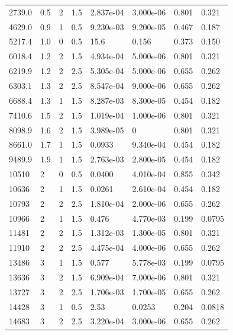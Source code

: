 \documentclass[preview]{standalone}
\begin{document}
{{\begin{tabular}{L{1.2cm}C{1.2cm} C{0.3cm}C{0.5cm} C{1.4cm}C{1.4cm} C{1.4cm}C{1.4cm}}
  2739.0  &   0.5  & 2     & 1.5 &  2.837e-04  & 3.000e-06  & 0.801 &  0.321   \\ 
  4629.0  &   0.9  & 1     & 0.5 &  9.230e-03  & 9.200e-05  & 0.467 &  0.187   \\ 
  5217.4  &   1.0  & 0     & 0.5 &  15.6  & 0.156  & 0.373 &  0.150   \\ 
  6018.4  &   1.2  & 2     & 1.5 &  4.934e-04  & 5.000e-06  & 0.801 &  0.321   \\ 
  6219.9  &   1.2  & 2     & 2.5 &  5.305e-04  & 5.000e-06  & 0.655 &  0.262   \\ 
  6303.1  &   1.3  & 2     & 2.5 &  8.547e-04  & 9.000e-06  & 0.655 &  0.262   \\ 
  6688.4  &   1.3  & 1     & 1.5 &  8.287e-03  & 8.300e-05  & 0.454 &  0.182   \\ 
  7410.6  &   1.5  & 2     & 1.5 &  1.019e-04  & 1.000e-06  & 0.801 &  0.321   \\ 
  8098.9  &   1.6  & 2     & 1.5 &  3.989e-05  & 0  & 0.801 &  0.321   \\ 
  8661.0  &   1.7  & 1     & 1.5 &  0.0933  & 9.340e-04  & 0.454 &  0.182   \\ 
  9489.9  &   1.9  & 1     & 1.5 &  2.763e-03  & 2.800e-05  & 0.454 &  0.182   \\ 
  10510  &     2  & 0     & 0.5 &  0.0400  & 4.010e-04  & 0.855 &  0.342   \\ 
  10636  &     2  & 1     & 1.5 &  0.0261  & 2.610e-04  & 0.454 &  0.182   \\ 
  10793  &     2  & 2     & 2.5 &  1.810e-04  & 2.000e-06  & 0.655 &  0.262   \\ 
  10966  &     2  & 1     & 1.5 &  0.476  & 4.770e-03  & 0.199 &  0.0795   \\ 
  11481  &     2  & 2     & 1.5 &  1.312e-03  & 1.300e-05  & 0.801 &  0.321   \\ 
  11910  &     2  & 2     & 2.5 &  4.475e-04  & 4.000e-06  & 0.655 &  0.262   \\ 
  13486  &     3  & 1     & 1.5 &  0.577  & 5.778e-03  & 0.199 &  0.0795   \\ 
  13636  &     3  & 2     & 1.5 &  6.909e-04  & 7.000e-06  & 0.801 &  0.321   \\ 
  13727  &     3  & 2     & 2.5 &  1.706e-03  & 1.700e-05  & 0.655 &  0.262   \\ 
  14428  &     3  & 1     & 0.5 &  2.53  & 0.0253  & 0.204 &  0.0818   \\ 
  14683  &     3  & 2     & 2.5 &  3.220e-04  & 3.000e-06  & 0.655 &  0.262   \\ 

\end{tabular}}}
\end{document}
